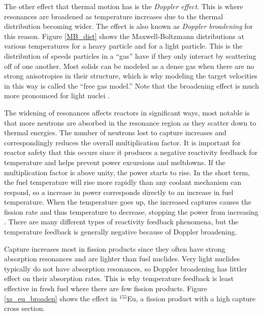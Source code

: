 The other effect that thermal motion has is the \emph{Doppler effect}.  This is where resonances are broadened as temperature increases due to the thermal distribution becoming wider.  The effect is also known as \emph{Doppler broadening} for this reason.  Figure \ref{MB_dist} shows the Maxwell-Boltzmann distributions at various temperatures for a heavy particle and for a light particle.  This is the distribution of speeds particles in a ``gas'' have if they only interact by scattering off of one another.  Most solids can be modeled as a dense gas when there are no strong anisotropies in their structure, which is why modeling the target velocities in this way is called the ``free gas model.''  Note that the broadening effect is much more pronounced for light nuclei \cite{duderstadt}.  %

The widening of resonances affects reactors in significant ways, most notable is that more neutrons are absorbed in the resonance region as they scatter down to thermal energies.  The number of neutrons lost to capture increases and correspondingly reduces the overall multiplication factor.  It is important for reactor safety that this occurs since it produces a negative reactivity feedback for temperature and helps prevent power excursions and meltdowns.  If the multiplication factor is above unity, the power starts to rise.  In the short term, the fuel temperature will rise more rapidly than any coolant mechanism can respond, so a increase in power corresponds directly to an increase in fuel temperature.
  When the temperature goes up, the increased captures causes the fission rate and thus temperature to decrease, stopping the power from increasing \cite{duderstadt}. There are many different types of reactivity feedback phenomena, but the temperature feedback is generally negative because of Doppler broadening.  
  
Capture increases most in fission products since they often have strong absorption resonances and are lighter than fuel nuclides.  Very light nuclides typically do not have absorption resonances, so Doppler broadening has littler effect on their absorption rates.
  This is why temperature feedback is least effective in fresh fuel where there are few fission products.  Figure \ref{xs_eu_broaden} shows the effect in  $^{155}$Eu, a fission product with a high capture cross section.

